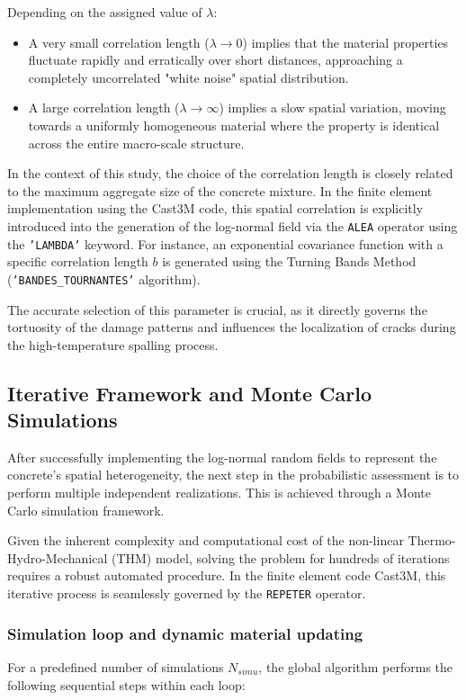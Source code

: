\documentclass[a4paper,12pt,twoside]{report}     %
\begin{document}
Depending on the assigned value of $\lambda$:
\begin{itemize}
    \item A very small correlation length ($\lambda \rightarrow 0$) implies that the material properties fluctuate rapidly and erratically over short distances, approaching a completely uncorrelated "white noise" spatial distribution.
    \item A large correlation length ($\lambda \rightarrow \infty$) implies a slow spatial variation, moving towards a uniformly homogeneous material where the property is identical across the entire macro-scale structure.
\end{itemize}

In the context of this study, the choice of the correlation length is closely related to the maximum aggregate size of the concrete mixture. In the finite element implementation using the Cast3M code, this spatial correlation is explicitly introduced into the generation of the log-normal field via the \texttt{ALEA} operator using the \texttt{'LAMBDA'} keyword. For instance, an exponential covariance function with a specific correlation length $b$ is generated using the Turning Bands Method (\texttt{'BANDES\_TOURNANTES'} algorithm). 

The accurate selection of this parameter is crucial, as it directly governs the tortuosity of the damage patterns and influences the localization of cracks during the high-temperature spalling process.

\subsection{Iterative Framework and Monte Carlo Simulations}

After successfully implementing the log-normal random fields to represent the concrete's spatial heterogeneity, the next step in the probabilistic assessment is to perform multiple independent realizations. This is achieved through a Monte Carlo simulation framework.

Given the inherent complexity and computational cost of the non-linear Thermo-Hydro-Mechanical (THM) model, solving the problem for hundreds of iterations requires a robust automated procedure. In the finite element code Cast3M, this iterative process is seamlessly governed by the \texttt{REPETER} operator.

\subsubsection{Simulation loop and dynamic material updating}
For a predefined number of simulations $N_{simu}$, the global algorithm performs the following sequential steps within each loop:
\end{document}
